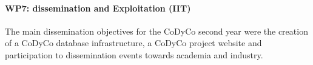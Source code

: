 \paragraph{WP7: dissemination and Exploitation (IIT)}

The main dissemination objectives for the CoDyCo second year were the creation of a CoDyCo database infrastructure, a CoDyCo project website and participation to dissemination events towards academia and industry. 
